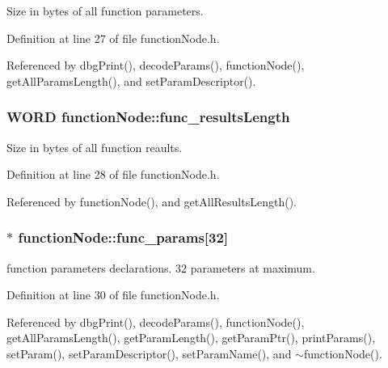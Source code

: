 Size in bytes of all function parameters. 



Definition at line 27 of file functionNode.h.



Referenced by dbgPrint(), decodeParams(), functionNode(), getAllParamsLength(), and setParamDescriptor().

\hypertarget{classfunctionNode_a7e10a910431de31b84a2979c52612127}{
\subsubsection[{func\_\-resultsLength}]{\setlength{\rightskip}{0pt plus 5cm}WORD {\bf functionNode::func\_\-resultsLength}}}
\label{d1/d20/classfunctionNode_a7e10a910431de31b84a2979c52612127}


Size in bytes of all function reaults. 



Definition at line 28 of file functionNode.h.



Referenced by functionNode(), and getAllResultsLength().

\hypertarget{classfunctionNode_a8703efbb76551c269a94576f99d9b927}{
\subsubsection[{func\_\-params}]{$\ast$ {\bf functionNode::func\_\-params}\mbox{[}32\mbox{]}}}
\label{d1/d20/classfunctionNode_a8703efbb76551c269a94576f99d9b927}


function parameters declarations. 32 parameters at maximum. 



Definition at line 30 of file functionNode.h.



Referenced by dbgPrint(), decodeParams(), functionNode(), getAllParamsLength(), getParamLength(), getParamPtr(), printParams(), setParam(), setParamDescriptor(), setParamName(), and $\sim$functionNode().


